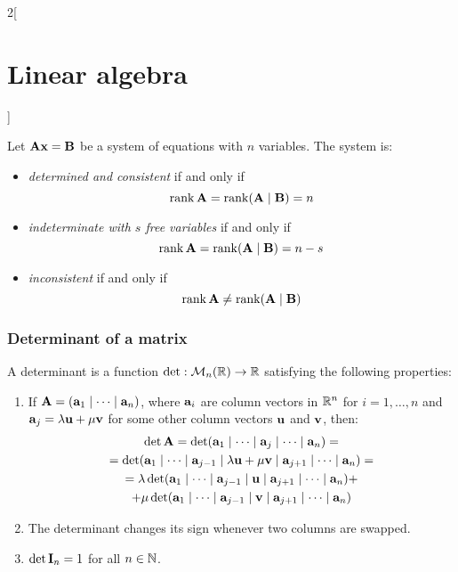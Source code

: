 \documentclass[../../../main.tex]{subfiles}
\begin{document}
\begin{multicols}{2}[\section{Linear algebra}]
\begin{theorem}
    Let $\vb{A}\vb{x}=\vb{B}$ be a system of equations with $n$ variables. The system is:
    \begin{itemize}
        \item \textit{determined and consistent} if and only if $$\rank \vb{A}=\rank (\vb{A}\mid \vb{B})=n$$
        \item \textit{indeterminate with $s$ free variables} if and only if $$\rank \vb{A}=\rank (\vb{A}\mid \vb{B})=n-s$$
        \item \textit{inconsistent} if and only if $$\rank \vb{A}\ne\rank (\vb{A}\mid \vb{B})$$
    \end{itemize}
\end{theorem}
\subsubsection*{Determinant of a matrix}
\begin{definition}[Determinant]
    A determinant is a function $\det:\mathcal{M}_n(\mathbb{R})\rightarrow\mathbb{R}$ satisfying the following properties:
    \begin{enumerate}
        \item If $\vb{A}=(\vb{a}_1\mid\cdots\mid \vb{a}_n)$, where $\vb{a}_i$ are column vectors in $\mathbb{R}^n$ for $i=1,\ldots,n$ and $\vb{a}_j=\lambda\vb{u}+\mu\vb{v}$ for some other column vectors $\vb{u}$ and $\vb{v}$, then:
        \begin{multline*}
            \det \vb{A}=\det(\vb{a}_1\mid\cdots\mid\vb{a}_j\mid\cdots\mid \vb{a}_n)=\\=\det(\vb{a}_1\mid\cdots\mid \vb{a}_{j-1}\mid\lambda \vb{u}+\mu \vb{v}\mid \vb{a}_{j+1}\mid\cdots\mid \vb{a}_n)=\\=\lambda\det(\vb{a}_1\mid\cdots\mid \vb{a}_{j-1}\mid \vb{u}\mid \vb{a}_{j+1}\mid\cdots\mid \vb{a}_n)+\\+\mu\det(\vb{a}_1\mid\cdots\mid \vb{a}_{j-1}\mid \vb{v}\mid \vb{a}_{j+1}\mid\cdots\mid \vb{a}_n)
        \end{multline*}
        \item The determinant changes its sign whenever two columns are swapped.
        \item $\det \vb{I}_n=1$ for all $n\in\mathbb{N}$.
    \end{enumerate}

\end{definition}
\end{multicols}
\end{document}
